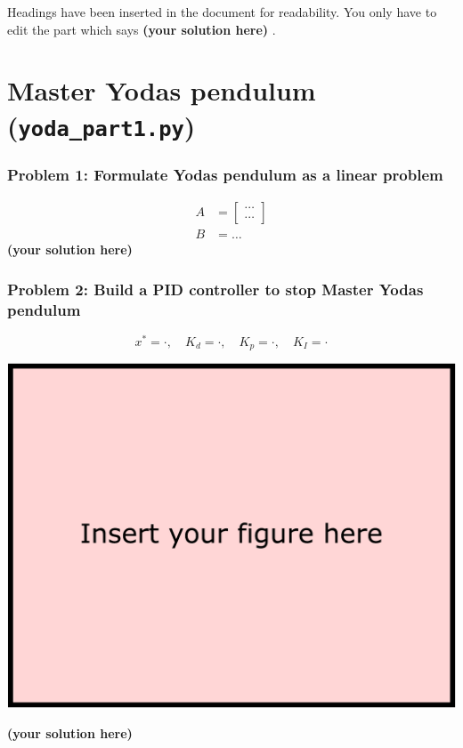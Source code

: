 \documentclass[12pt,twoside]{article}
\newcommand\redt[1]{ {\textcolor[rgb]{0.60, 0.00, 0.00}{\textbf{ #1} } } }
\newcommand{\yoursolution}{ \redt{(your solution here) } }
\begin{document}

Headings have been inserted in the document for readability. You only have to edit the part which says \yoursolution. 

\section{Master Yodas pendulum (\texttt{yoda\_part1.py})}\label{yoda1}
\subsubsection*{{\color{red}Problem 1:  Formulate Yodas pendulum as a linear problem}}
	
	\begin{align}
		A & = \begin{bmatrix} \cdots \\ \cdots \end{bmatrix}  \\
		B & = \dots 		
	\end{align}
	\yoursolution 	
	
\subsubsection*{{\color{red}Problem 2:  Build a PID controller to stop Master Yodas pendulum}}

	$$
x^* = \cdot, \quad	K_d = \cdot, \quad K_p = \cdot, \quad K_I=\cdot
	$$
\begin{center}\includegraphics[width=.8\linewidth]{figures/your_answer} \end{center}
\yoursolution	
\end{document}
